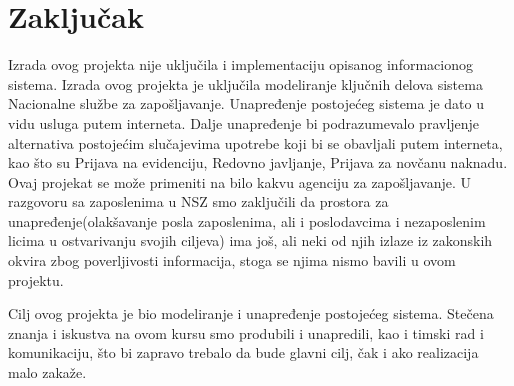 \section{Zaklju\v cak}

Izrada ovog projekta nije uključila i implementaciju opisanog informacionog sistema.
Izrada ovog projekta je uključila modeliranje ključnih delova sistema Nacionalne službe za zapošljavanje. 
Unapređenje postojećeg sistema je dato u vidu usluga putem interneta. Dalje unapređenje bi podrazumevalo pravljenje alternativa postojećim slučajevima upotrebe koji bi se obavljali putem interneta, kao što su Prijava na evidenciju, Redovno javljanje, Prijava za novčanu naknadu.
Ovaj projekat se može primeniti na bilo kakvu agenciju za zapošljavanje.
U razgovoru sa zaposlenima u NSZ smo zaključili da prostora za unapređenje(olakšavanje posla zaposlenima, ali i poslodavcima i nezaposlenim licima u ostvarivanju svojih ciljeva) ima još, ali neki od njih izlaze iz zakonskih okvira zbog poverljivosti informacija, stoga se njima nismo bavili u ovom projektu.

Cilj ovog projekta je bio modeliranje i unapređenje postojećeg sistema. Stečena znanja i iskustva na ovom kursu smo produbili i unapredili, kao i timski rad i komunikaciju, što bi zapravo trebalo da bude glavni cilj, čak i ako realizacija malo zakaže.
